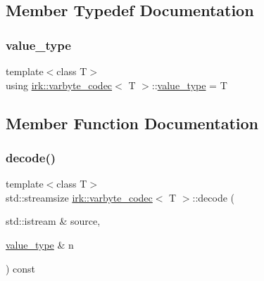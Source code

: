 \subsection{Member Typedef Documentation}
\mbox{\label{structirk_1_1varbyte__codec_a362fbaf8b27a38eb23a52a85b1af68ac}} 
\subsubsection{\texorpdfstring{value\+\_\+type}{value\_type}}
{\footnotesize\ttfamily template$<$class T$>$ \\
using \mbox{\hyperlink{structirk_1_1varbyte__codec}{irk\+::varbyte\+\_\+codec}}$<$ T $>$\+::\mbox{\hyperlink{structirk_1_1varbyte__codec_a362fbaf8b27a38eb23a52a85b1af68ac}{value\+\_\+type}} =  T}



\subsection{Member Function Documentation}
\mbox{\label{structirk_1_1varbyte__codec_aba60747b7941c1f10d104f1cf0778534}} 
\subsubsection{\texorpdfstring{decode()}{decode()}}
{\footnotesize\ttfamily template$<$class T$>$ \\
std\+::streamsize \mbox{\hyperlink{structirk_1_1varbyte__codec}{irk\+::varbyte\+\_\+codec}}$<$ T $>$\+::decode (\begin{DoxyParamCaption}\item[{std\+::istream \&}]{source,  }\item[{\mbox{\hyperlink{structirk_1_1varbyte__codec_a362fbaf8b27a38eb23a52a85b1af68ac}{value\+\_\+type}} \&}]{n }\end{DoxyParamCaption}) const\hspace{0.3cm}{\ttfamily [inline]}}

\mbox{\label{structirk_1_1varbyte__codec_a82d69fd436aa9ea1626ad756cfdb6e88}} 

